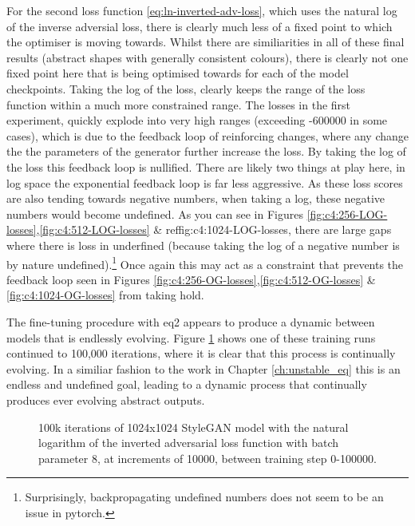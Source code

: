 For the second loss function \ref{eq:ln-inverted-adv-loss}, which uses the natural log of the inverse adversial loss, there is clearly much less of a fixed point to which the optimiser is moving towards. 
Whilst there are similiarities in all of these final results (abstract shapes with generally consistent colours), there is clearly not one fixed point here that is being optimised towards for each of the model checkpoints.
Taking the log of the loss, clearly keeps the range of the loss function within a much more constrained range.
The losses in the first experiment, quickly explode into very high ranges (exceeding -600000 in some cases), which is due to the feedback loop of reinforcing changes, where any change the the parameters of the generator further increase the loss.
By taking the log of the loss this feedback loop is nullified. 
There are likely two things at play here, in log space the exponential feedback loop is far less aggressive. 
As these loss scores are also tending towards negative numbers, when taking a log, these negative numbers would become undefined.
As you can see in Figures \ref{fig:c4:256-LOG-losses},\ref{fig:c4:512-LOG-losses} \& ref{fig:c4:1024-LOG-losses}, there are large gaps where there is loss in underfined (because taking the log of a negative number is by nature undefined).\footnote{Surprisingly, backpropagating undefined numbers does not seem to be an issue in pytorch.}
Once again this may act as a constraint that prevents the feedback loop seen in Figures \ref{fig:c4:256-OG-losses},\ref{fig:c4:512-OG-losses} \& \ref{fig:c4:1024-OG-losses} from taking hold.

The fine-tuning procedure with eq2 appears to produce a dynamic between models that is endlessly evolving. 
Figure \ref{fig:c4:100k-iterations} shows one of these training runs continued to 100,000 iterations, where it is clear that this process is continually evolving.
In a similiar fashion to the work in Chapter \ref{ch:unstable_eq} this is an endless and undefined goal, leading to a dynamic process that continually produces ever evolving abstract outputs.

\begin{figure}[!htbp]
  \centering
  \caption[100k iterations of 1024x1024 StyleGAN model with the natural logarithm of the inverted adversarial loss function]{100k iterations of 1024x1024 StyleGAN model with the natural logarithm of the inverted adversarial loss function with batch parameter 8, at increments of 10000, between training step 0-100000.}
  \label{fig:c4:100k-iterations}
\end{figure}

